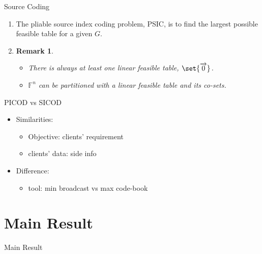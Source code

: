 \documentclass[xcolor=dvipsnames, aspectratio=169]{beamer}
\newtheorem{remark}[theorem]{Remark}
\begin{document}
\begin{frame}{Source Coding }
	\begin{enumerate}[]
		\item<1->[]
		\begin{definition}
			The pliable source index coding problem, PSIC, is to find the largest possible feasible table for a given $G$.
		\end{definition}
		\item<2->[]
		\begin{remark}
			\begin{itemize}[label=\Roman*.]
				\item<2->[] There is always at least one linear feasible table, $\set{\overrightarrow{0}}$.
				\item<3->[] $\mathbb{F}^n$ can be partitioned with a linear feasible table and its co-sets.
			\end{itemize}
		\end{remark}
	\end{enumerate}
\end{frame}
\begin{frame}{PICOD vs SICOD}
	\begin{itemize}
	\item<1->[]	Similarities: 
	\begin{itemize}
		\item <2->[]
				Objective: clients' requirement
		\item<3->[]
		clients' data: side info
	\end{itemize}
	\item<4->[]	Difference: 
	\begin{itemize}
		\item <5->[]
		tool: min broadcast vs max code-book
	\end{itemize}
\end{itemize}
\end{frame}

\section{Main Result}
\begin{frame}
	\centering
	\Huge
	Main Result
\end{frame}
\end{document}
